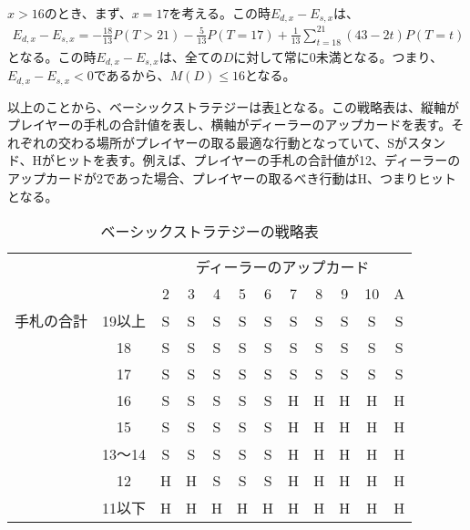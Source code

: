         \subsubsection{}
            $x>16$のとき、まず、$x=17$を考える。この時$E_{d,x}-E_{s,x}$は、
            \begin{displaymath}
                \begin{split}
                    E_{d,x}-E_{s,x}=-\frac{18}{13}P(T>21)-\frac{5}{13}P(T=17)+\frac{1}{13}\sum_{t=18}^21(43-2t)P(T=t)
                \end{split}
            \end{displaymath}
            となる。この時$E_{d,x}-E_{s,x}$は、全ての$D$に対して常に0未満となる。つまり、$E_{d,x}-E_{s,x}<0$であるから、$M(D)\leq 16$となる。
        
        以上のことから、ベーシックストラテジーは表\ref{basicstrategytable}となる。この戦略表は、縦軸がプレイヤーの手札の合計値を表し、横軸がディーラーのアップカードを表す。それぞれの交わる場所がプレイヤーの取る最適な行動となっていて、Sがスタンド、Hがヒットを表す。例えば、プレイヤーの手札の合計値が12、ディーラーのアップカードが2であった場合、プレイヤーの取るべき行動はH、つまりヒットとなる。
        \begin{table}[H]
            \begin{center}
            \label{basicstrategytable}
            \caption{ベーシックストラテジーの戦略表}
            \begin{tabular}{|lc|c|c|c|c|c|c|c|c|c|c|}
                \hline
                                            &       & \multicolumn{10}{c|}{ディーラーのアップカード}     \\ \cline{3-12} 
                                            &       & 2 & 3 & 4 & 5 & 6 & 7 & 8 & 9 & 10 & A \\ \hline
                \multicolumn{1}{|l|}{手札の合計} & 19以上  & S & S & S & S & S & S & S & S & S  & S \\ \cline{2-12} 
                \multicolumn{1}{|l|}{}      & 18    & S & S & S & S & S & S & S & S & S  & S \\ \cline{2-12} 
                \multicolumn{1}{|l|}{}      & 17    & S & S & S & S & S & S & S & S & S  & S \\ \cline{2-12} 
                \multicolumn{1}{|l|}{}      & 16    & S & S & S & S & S & H & H & H & H  & H \\ \cline{2-12} 
                \multicolumn{1}{|l|}{}      & 15    & S & S & S & S & S & H & H & H & H  & H \\ \cline{2-12} 
                \multicolumn{1}{|l|}{}      & 13～14 & S & S & S & S & S & H & H & H & H  & H \\ \cline{2-12} 
                \multicolumn{1}{|l|}{}      & 12    & H & H & S & S & S & H & H & H & H  & H \\ \cline{2-12} 
                \multicolumn{1}{|l|}{}      & 11以下  & H & H & H & H & H & H & H & H & H  & H \\ \hline
                \end{tabular}
            \end{center}
            \end{table}
    
